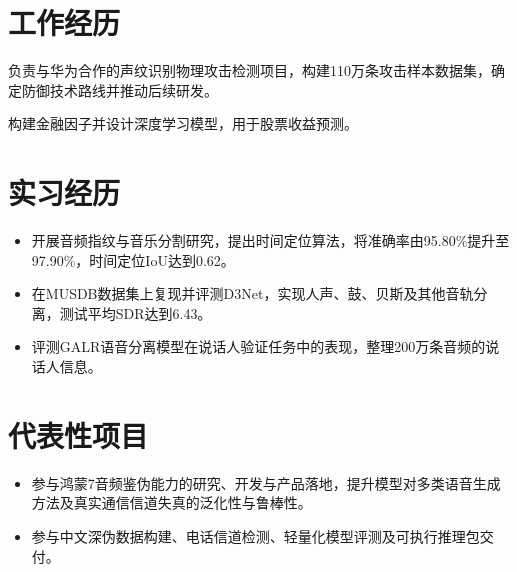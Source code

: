 \documentclass{resume}
\begin{document}
\section{工作经历}
负责与华为合作的声纹识别物理攻击检测项目，构建110万条攻击样本数据集，确定防御技术路线并推动后续研发。

构建金融因子并设计深度学习模型，用于股票收益预测。

\newpage

\section{实习经历}
\begin{itemize}
  \item 开展音频指纹与音乐分割研究，提出时间定位算法，将准确率由95.80\%提升至97.90\%，时间定位IoU达到0.62。
\end{itemize}

\begin{itemize}
  \item 在MUSDB数据集上复现并评测D3Net，实现人声、鼓、贝斯及其他音轨分离，测试平均SDR达到6.43。
\end{itemize}

\begin{itemize}
  \item 评测GALR语音分离模型在说话人验证任务中的表现，整理200万条音频的说话人信息。
\end{itemize}

\section{代表性项目}
\begin{itemize}
  \item 参与鸿蒙7音频鉴伪能力的研究、开发与产品落地，提升模型对多类语音生成方法及真实通信信道失真的泛化性与鲁棒性。
  \item 参与中文深伪数据构建、电话信道检测、轻量化模型评测及可执行推理包交付。
\end{itemize}
\end{document}
